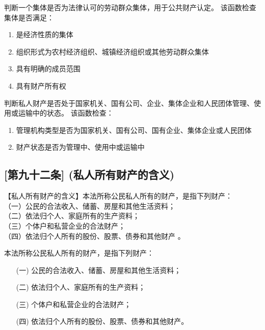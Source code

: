 \begin{definition}\label{isLegalCollective}
\leanok
{}
判断一个集体是否为法律认可的劳动群众集体，用于公共财产认定。
该函数检查集体是否满足：
\begin{enumerate}
\item 是经济性质的集体
\item 组织形式为农村经济组织、城镇经济组织或其他劳动群众集体
\item 具有明确的成员范围
\item 具有财产所有权
\end{enumerate}
\end{definition}

\begin{definition}\label{isInSpecialState}
\leanok
{}
判断私人财产是否处于国家机关、国有公司、企业、集体企业和人民团体管理、使用或运输中的状态。
该函数检查：
\begin{enumerate}
\item 管理机构类型是否为国家机关、国有公司、国有企业、集体企业或人民团体
\item 财产状态是否为管理中、使用中或运输中
\end{enumerate}
\end{definition}

\subsection{[第九十二条] (私人所有财产的含义)}

【私人所有财产的含义】本法所称公民私人所有的财产，是指下列财产：\\
（一）公民的合法收入、储蓄、房屋和其他生活资料；\\
（二）依法归个人、家庭所有的生产资料；\\
（三）个体户和私营企业的合法财产；\\
（四）依法归个人所有的股份、股票、债券和其他财产 。

\begin{definition}\label{isPrivateProperty}
\leanok
{}
本法所称公民私人所有的财产，是指下列财产：
\begin{enumerate}
\item[(一)] 公民的合法收入、储蓄、房屋和其他生活资料；
\item[(二)] 依法归个人、家庭所有的生产资料；
\item[(三)] 个体户和私营企业的合法财产；
\item[(四)] 依法归个人所有的股份、股票、债券和其他财产。
\end{enumerate}
\end{definition}

